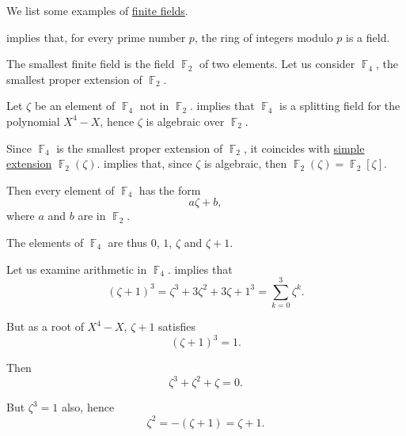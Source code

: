 \begin{example}\label{ex:def:finite_field}
  We list some examples of \hyperref[def:finite_field]{finite fields}.
  \begin{thmenum}
      implies that, for every prime number \( p \), the ring of integers modulo \( p \) is a field.

     The smallest finite field is the field \( \BbbF_2 \) of two elements. Let us consider \( \BbbF_4 \), the smallest proper extension of \( \BbbF_2 \).

    Let \( \zeta \) be an element of \( \BbbF_4 \) not in \( \BbbF_2 \).  implies that \( \BbbF_4 \) is a splitting field for the polynomial \( X^4 - X \), hence \( \zeta \) is algebraic over \( \BbbF_2 \).

    Since \( \BbbF_4 \) is the smallest proper extension of \( \BbbF_2 \), it coincides with \hyperref[def:simple_field_extension]{simple extension} \( \BbbF_2(\zeta) \).  implies that, since \( \zeta \) is algebraic, then \( \BbbF_2(\zeta) = \BbbF_2[\zeta] \).

    Then every element of \( \BbbF_4 \) has the form
    \begin{equation*}
      a \zeta + b,
    \end{equation*}
    where \( a \) and \( b \) are in \( \BbbF_2 \).

    The elements of \( \BbbF_4 \) are thus \( 0 \), \( 1 \), \( \zeta \) and \( \zeta + 1 \).

    Let us examine arithmetic in \( \BbbF_4 \).  implies that
    \begin{equation*}
      (\zeta + 1)^3 = \zeta^3 + 3\zeta^2 + 3\zeta + 1^3 = \sum_{k=0}^3 \zeta^k.
    \end{equation*}

    But as a root of \( X^4 - X \), \( \zeta + 1 \) satisfies
    \begin{equation*}
      (\zeta + 1)^3 = 1.
    \end{equation*}

    Then
    \begin{equation*}
      \zeta^3 + \zeta^2 + \zeta = 0.
    \end{equation*}

    But \( \zeta^3 = 1 \) also, hence
    \begin{equation}\label{eq:ex:def:finite_field/f4/minimal/characteristic}
      \zeta^2 = -(\zeta + 1) = \zeta + 1.
    \end{equation}


\end{thmenum}
\end{example}
